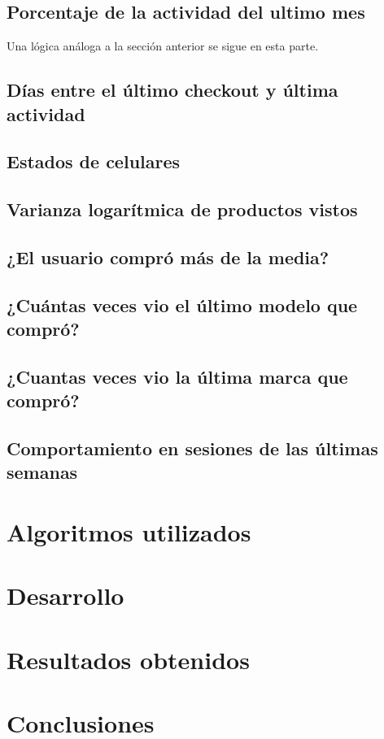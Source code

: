 \documentclass[a4paper]{article}
\begin{document}
\begin{itemize}
\begin{itemize}
\end{itemize}

\subsection{Porcentaje de la actividad del ultimo mes}
Una lógica análoga a la sección anterior se sigue en esta parte.

\subsection{Días entre el último checkout y última actividad}

\subsection{Estados de celulares}

\subsection{Varianza logarítmica de productos vistos}

\subsection{¿El usuario compró más de la media?}

\subsection{¿Cuántas veces vio el último modelo que compró?}

\subsection{¿Cuantas veces vio la última marca que compró?}

\subsection{Comportamiento en sesiones de las últimas semanas}



\section{Algoritmos utilizados}

\section{Desarrollo}

\section{Resultados obtenidos}

\section{Conclusiones}
\end{document}
